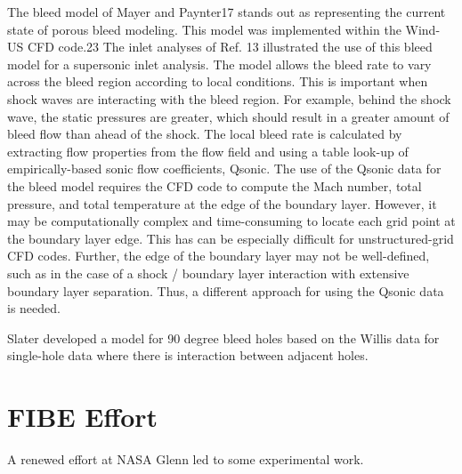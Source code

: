 \documentclass{article}
\begin{document}
The bleed model of Mayer and Paynter17 stands out as representing the current state of porous bleed modeling. This model was implemented within the Wind-US CFD code.23 The inlet analyses of Ref. 13 illustrated the use of this bleed model for a supersonic inlet analysis. The model allows the bleed rate to vary across the bleed region according to local conditions. This is important when shock waves are interacting with the bleed region. For example, behind the shock wave, the static pressures are greater, which should result in a greater amount of bleed flow than ahead of the shock. The local bleed rate is calculated by extracting flow properties from the flow field and using a table look-up of empirically-based sonic flow coefficients, Qsonic. The use of the Qsonic data for the bleed model requires the CFD code to compute the Mach number, total pressure, and total temperature at the edge of the boundary layer. However, it may be computationally complex and time-consuming to locate each grid point at the boundary layer edge. This has can be especially difficult for unstructured-grid CFD codes. Further, the edge of the boundary layer may not be well-defined, such as in the case of a shock / boundary layer interaction with extensive boundary layer separation. Thus, a different approach for using the Qsonic data is needed.







Slater \cite{Slater2009} developed a model for 90 degree bleed holes based on the Willis data for single-hole data where there is interaction between adjacent holes.


\section{FIBE Effort}

A renewed effort at NASA Glenn led to some experimental work. 
\end{document}
